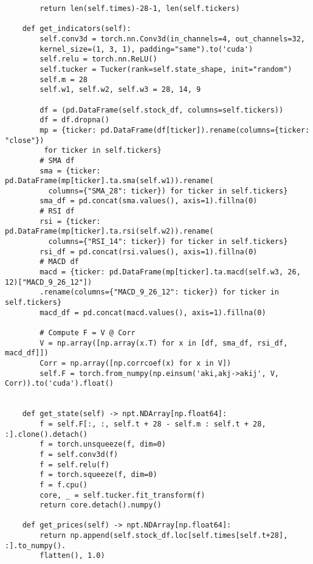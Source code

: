 \begin{verbatim}
        return len(self.times)-28-1, len(self.tickers)

    def get_indicators(self):
        self.conv3d = torch.nn.Conv3d(in_channels=4, out_channels=32,
        kernel_size=(1, 3, 1), padding="same").to('cuda')
        self.relu = torch.nn.ReLU()
        self.tucker = Tucker(rank=self.state_shape, init="random")
        self.m = 28
        self.w1, self.w2, self.w3 = 28, 14, 9
        
        df = (pd.DataFrame(self.stock_df, columns=self.tickers))
        df = df.dropna()
        mp = {ticker: pd.DataFrame(df[ticker]).rename(columns={ticker: "close"})
         for ticker in self.tickers}
        # SMA df
        sma = {ticker: pd.DataFrame(mp[ticker].ta.sma(self.w1)).rename(
          columns={"SMA_28": ticker}) for ticker in self.tickers}
        sma_df = pd.concat(sma.values(), axis=1).fillna(0)
        # RSI df
        rsi = {ticker: pd.DataFrame(mp[ticker].ta.rsi(self.w2)).rename(
          columns={"RSI_14": ticker}) for ticker in self.tickers}
        rsi_df = pd.concat(rsi.values(), axis=1).fillna(0)
        # MACD df
        macd = {ticker: pd.DataFrame(mp[ticker].ta.macd(self.w3, 26, 12)["MACD_9_26_12"])
        .rename(columns={"MACD_9_26_12": ticker}) for ticker in self.tickers}
        macd_df = pd.concat(macd.values(), axis=1).fillna(0)

        # Compute F = V @ Corr
        V = np.array([np.array(x.T) for x in [df, sma_df, rsi_df, macd_df]])
        Corr = np.array([np.corrcoef(x) for x in V])
        self.F = torch.from_numpy(np.einsum('aki,akj->akij', V, Corr)).to('cuda').float()


    def get_state(self) -> npt.NDArray[np.float64]:
        f = self.F[:, :, self.t + 28 - self.m : self.t + 28, :].clone().detach()      
        f = torch.unsqueeze(f, dim=0) 
        f = self.conv3d(f)
        f = self.relu(f)
        f = torch.squeeze(f, dim=0)
        f = f.cpu()
        core, _ = self.tucker.fit_transform(f)
        return core.detach().numpy()

    def get_prices(self) -> npt.NDArray[np.float64]:
        return np.append(self.stock_df.loc[self.times[self.t+28], :].to_numpy().
        flatten(), 1.0)
    
\end{verbatim}
